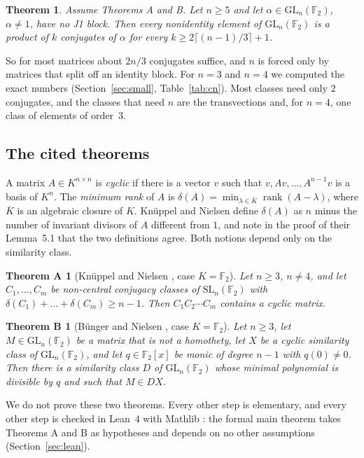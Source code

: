\documentclass[11pt]{amsart}
\newtheorem*{theoremA}{Theorem A}
\newtheorem*{theoremB}{Theorem B}
\newtheorem{mainthm}{Theorem}
\theoremstyle{definition}
\theoremstyle{remark}
\newcommand{\F}{\mathbb{F}_2}
\newcommand{\GL}{\mathrm{GL}}
\newcommand{\SL}{\mathrm{SL}}
\newcommand{\rk}{\operatorname{rank}}
\begin{document}
\begin{mainthm}\label{thm:far}
Assume Theorems A and B. Let $n\ge5$ and let $\alpha\in\GL_n(\F)$, $\alpha\ne1$, have no J1 block.
Then every nonidentity element of $\GL_n(\F)$ is a product of $k$ conjugates of $\alpha$ for every
$k\ge 2\lceil(n-1)/3\rceil+1$.
\end{mainthm}

So for most matrices about $2n/3$ conjugates suffice, and $n$ is forced only by matrices that
split off an identity block. For $n=3$ and $n=4$ we computed the exact numbers
(Section~\ref{sec:small}, Table~\ref{tab:cn}). Most classes need only $2$ conjugates, and the
classes that need $n$ are the transvections and, for $n=4$, one class of elements of order~$3$.

\subsection{The cited theorems}
A matrix $A\in K^{n\times n}$ is \emph{cyclic} if there is a vector $v$ such that
$v,Av,\dots,A^{n-1}v$ is a basis of $K^n$. The \emph{minimum rank} of $A$ is
$\delta(A)=\min_{\lambda\in\overline K}\rk(A-\lambda)$, where $\overline K$ is an algebraic
closure of $K$. Kn\"uppel and Nielsen define $\delta(A)$ as $n$ minus the number of invariant
divisors of $A$ different from $1$, and note in the proof of their Lemma~5.1 that the two
definitions agree. Both notions depend only on the similarity class.

\begin{theoremA}[{Kn\"uppel and Nielsen \cite[Corollary 6.9]{KN}, case $K=\F$}]
Let $n\ge3$, $n\ne4$, and let $C_1,\dots,C_m$ be non-central conjugacy classes of $\SL_n(\F)$ with
$\delta(C_1)+\dots+\delta(C_m)\ge n-1$. Then $C_1C_2\cdots C_m$ contains a cyclic matrix.
\end{theoremA}

\begin{theoremB}[{B\"unger and Nielsen \cite[Theorem 1.2]{BN}, case $K=\F$}]
Let $n\ge3$, let $M\in\GL_n(\F)$ be a matrix that is not a homothety, let $X$ be a cyclic
similarity class of $\GL_n(\F)$, and let $q\in\F[x]$ be monic of degree $n-1$ with $q(0)\ne0$.
Then there is a similarity class $D$ of $\GL_n(\F)$ whose minimal polynomial is divisible by $q$
and such that $M\in DX$.
\end{theoremB}

We do not prove these two theorems. Every other step is elementary, and every other step is
checked in Lean~4 \cite{Lean4} with Mathlib \cite{Mathlib}: the formal main theorem takes
Theorems A and B as hypotheses and depends on no other assumptions (Section~\ref{sec:lean}).
\end{document}
